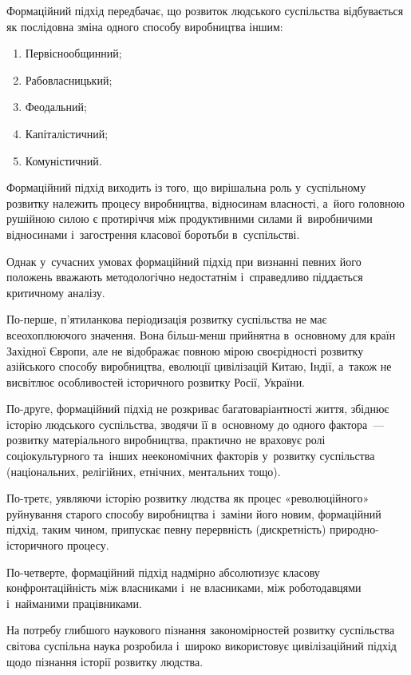 \documentclass[a5paper,oneside,DIV=12,12pt,headings=small]{scrartcl}
\begin{document}
		Формаційний підхід передбачає, що розвиток людського суспільства відбувається як послідовна зміна одного способу виробництва іншим:
		\begin{enumerate}
			\item Первіснообщинний;
			\item Рабовласницький;
			\item Феодальний;
			\item Капіталістичний;
			\item Комуністичний.
		\end{enumerate}

		Формаційний підхід виходить із того, що вирішальна роль у~суспільному розвитку належить процесу виробництва, відносинам власності, а~його головною рушійною силою є протиріччя між продуктивними силами й~виробничими відносинами і~загострення класової боротьби в~суспільстві.

		Однак у~сучасних умовах формаційний підхід при визнанні певних його положень вважають методологічно недостатнім і~справедливо піддається критичному аналізу.
		
		По-перше, п'ятиланкова періодизація розвитку суспільства не має всеохоплюючого значення. Вона більш-менш прийнятна в~основному для країн Західної Європи, але не відображає повною мірою своєрідності розвитку азійського способу виробництва, еволюції цивілізацій Китаю, Індії, а~також не висвітлює особливостей історичного розвитку Росії, України.

		По-друге, формаційний підхід не розкриває багатоваріантності життя, збіднює історію людського суспільства, зводячи її в~основному до одного фактора~— розвитку матеріального виробництва, практично не враховує ролі соціокультурного та~інших неекономічних факторів у~розвитку суспільства (національних, релігійних, етнічних, ментальних тощо).

		По-третє, уявляючи історію розвитку людства як процес «революційного» руйнування старого способу виробництва і~заміни його новим, формаційний підхід, таким чином, припускає певну перервність (дискретність) природно-історичного процесу.

		По-четверте, формаційний підхід надмірно абсолютизує класову конфронтаційність між власниками і~не власниками, між роботодавцями і~найманими працівниками.

		На потребу глибшого наукового пізнання закономірностей розвитку суспільства світова суспільна наука розробила і~широко використовує цивілізаційний підхід щодо пізнання історії розвитку людства.
		
\end{document}
